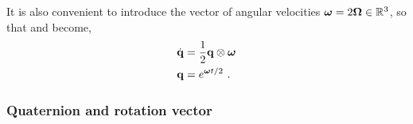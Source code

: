 It is also convenient to introduce the vector of angular velocities ${\bm \omega}=2{\bm \Omega}\in{\mathbb R}^3$, so that  and  become,
%
\begin{align}
\dot{{\bf q}} &= \frac12{\bf q}\otimes{\bm \omega} \label{equ:qdot} \\ 
{\bf q} &= e^{{\bm \omega} t/2}
~.
\end{align}
%


\subsubsection{Quaternion and rotation vector}
\label{sec:quatAndVector}

